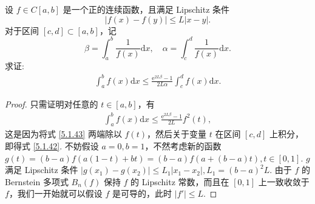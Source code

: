 \documentclass[../../main.tex]{subfiles}%
\begin{document}
\begin{example}
设 $f \in C[a,b]$ 是一个正的连续函数，且满足 Lipschitz 条件
$$|f(x) - f(y)| \leqslant L|x - y|.$$
对于区间 $[c,d] \subset [a,b]$，记
$$\beta = \int_a^b \frac{1}{f(x)} \mathrm{d}x, \quad \alpha = \int_c^d \frac{1}{f(x)} \mathrm{d}x.$$
求证:
\begin{align}
\int_a^b f(x) \mathrm{d}x \leqslant \frac{\mathrm{e}^{2L\beta} - 1}{2L\alpha} \int_c^d f(x) \mathrm{d}x. \label{5.1.42}
\end{align}
\end{example}
\begin{proof}
只需证明对任意的 $t \in [a,b]$，有
\begin{align}
\int_a^b f(x) \mathrm{d}x \leqslant \frac{\mathrm{e}^{2L\beta} - 1}{2L} f^2(t), \label{5.1.43}
\end{align}
这是因为将式 \eqref{5.1.43} 两端除以 $f(t)$，然后关于变量 $t$ 在区间 $[c,d]$ 上积分，即得式 \eqref{5.1.42}. 不妨假设 $a = 0, b = 1$，不然考虑新的函数 $g(t) =(b - a)f(a(1-t) + bt)= (b - a)f(a + (b - a)t), t \in [0,1]$. $g$ 满足 Lipschitz 条件 $|g(x_1) - g(x_2)| \leqslant L_1|x_1 - x_2|, L_1 = (b - a)^2L$. 由于 $f$ 的 Bernstein 多项式 $B_n(f)$ 保持 $f$ 的 Lipschitz 常数，而且在 $[0,1]$ 上一致收敛于 $f$，我们一开始就可以假设 $f$ 是可导的，此时 $|f'| \leqslant L$.


\end{proof}
\end{document}
